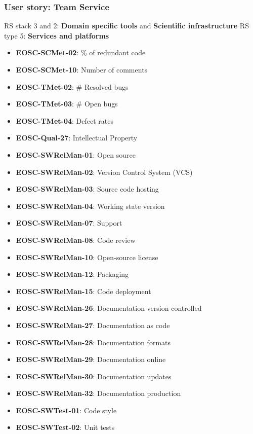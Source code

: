 \subsubsection{User story: Team Service}

RS stack 3 and 2: \textbf{Domain specific tools} and \textbf{Scientific infrastructure} \newline
RS type 5: \textbf{Services and platforms}

\begin{itemize}
    \item \textbf{EOSC-SCMet-02}: \% of redundant code
    \item \textbf{EOSC-SCMet-10}: Number of comments
    \item \textbf{EOSC-TMet-02}: \# Resolved bugs
    \item \textbf{EOSC-TMet-03}: \# Open bugs
    \item \textbf{EOSC-TMet-04}: Defect rates
    \item \textbf{EOSC-Qual-27}: Intellectual Property
    \item \textbf{EOSC-SWRelMan-01}: Open source
    \item \textbf{EOSC-SWRelMan-02}: Version Control System (VCS)
    \item \textbf{EOSC-SWRelMan-03}: Source code hosting
    \item \textbf{EOSC-SWRelMan-04}: Working state version
    \item \textbf{EOSC-SWRelMan-07}: Support
    \item \textbf{EOSC-SWRelMan-08}: Code review
    \item \textbf{EOSC-SWRelMan-10}: Open-source license
    \item \textbf{EOSC-SWRelMan-12}: Packaging
    \item \textbf{EOSC-SWRelMan-15}: Code deployment
    \item \textbf{EOSC-SWRelMan-26}: Documentation version controlled
    \item \textbf{EOSC-SWRelMan-27}: Documentation as code
    \item \textbf{EOSC-SWRelMan-28}: Documentation formats
    \item \textbf{EOSC-SWRelMan-29}: Documentation online
    \item \textbf{EOSC-SWRelMan-30}: Documentation updates
    \item \textbf{EOSC-SWRelMan-32}: Documentation production
    \item \textbf{EOSC-SWTest-01}: Code style
    \item \textbf{EOSC-SWTest-02}: Unit tests

\end{itemize}

